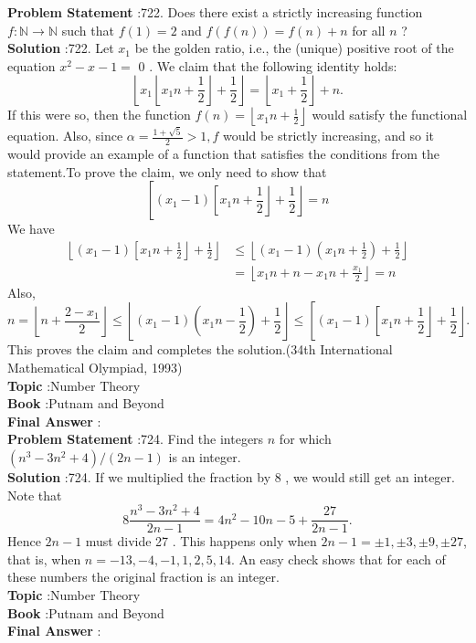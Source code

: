 \documentclass[10pt]{article}
\begin{document}
\textbf{Problem Statement} :722. Does there exist a strictly increasing function $f: \mathbb{N} \rightarrow \mathbb{N}$ such that $f(1)=2$ and $f(f(n))=f(n)+n$ for all $n$ ?\\
\textbf{Solution} :722. Let $x_{1}$ be the golden ratio, i.e., the (unique) positive root of the equation $x^{2}-x-1=$ 0 . We claim that the following identity holds:$$ \left\lfloor x_{1}\left\lfloor x_{1} n+\frac{1}{2}\right\rfloor+\frac{1}{2}\right\rfloor=\left\lfloor x_{1}+\frac{1}{2}\right\rfloor+n . $$If this were so, then the function $f(n)=\left\lfloor x_{1} n+\frac{1}{2}\right\rfloor$ would satisfy the functional equation. Also, since $\alpha=\frac{1+\sqrt{5}}{2}>1, f$ would be strictly increasing, and so it would provide an example of a function that satisfies the conditions from the statement.To prove the claim, we only need to show that$$ \left[\left(x_{1}-1\right)\left[x_{1} n+\frac{1}{2}\right\rfloor+\frac{1}{2}\right\rfloor=n $$We have$$ \begin{aligned} \left\lfloor\left(x_{1}-1\right)\left[x_{1} n+\frac{1}{2}\right\rfloor+\frac{1}{2}\right\rfloor & \leq\left\lfloor\left(x_{1}-1\right)\left(x_{1} n+\frac{1}{2}\right)+\frac{1}{2}\right\rfloor \\ &=\left\lfloor x_{1} n+n-x_{1} n+\frac{x_{1}}{2}\right\rfloor=n \end{aligned} $$Also,$$ n=\left\lfloor n+\frac{2-x_{1}}{2}\right\rfloor \leq\left\lfloor\left(x_{1}-1\right)\left(x_{1} n-\frac{1}{2}\right)+\frac{1}{2}\right\rfloor \leq\left[\left(x_{1}-1\right)\left[x_{1} n+\frac{1}{2}\right\rfloor+\frac{1}{2}\right\rfloor . $$This proves the claim and completes the solution.(34th International Mathematical Olympiad, 1993)\\
\textbf{Topic} :Number Theory\\
\textbf{Book} :Putnam and Beyond\\
\textbf{Final Answer} :\\


\textbf{Problem Statement} :724. Find the integers $n$ for which $\left(n^{3}-3 n^{2}+4\right) /(2 n-1)$ is an integer.\\
\textbf{Solution} :724. If we multiplied the fraction by 8 , we would still get an integer. Note that$$ 8 \frac{n^{3}-3 n^{2}+4}{2 n-1}=4 n^{2}-10 n-5+\frac{27}{2 n-1} . $$Hence $2 n-1$ must divide 27 . This happens only when $2 n-1=\pm 1, \pm 3, \pm 9, \pm 27$, that is, when $n=-13,-4,-1,1,2,5,14$. An easy check shows that for each of these numbers the original fraction is an integer.\\
\textbf{Topic} :Number Theory\\
\textbf{Book} :Putnam and Beyond\\
\textbf{Final Answer} :\\
\end{document}

